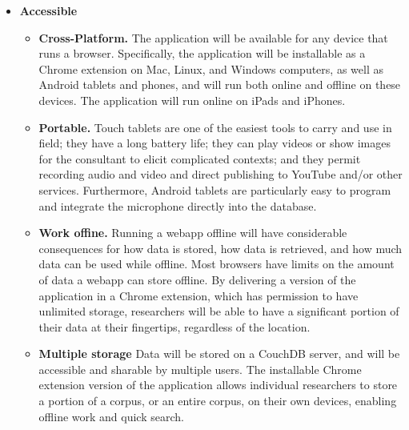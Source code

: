 \documentclass[12 pt]{article}
\begin{document}
\begin{itemize}
\item{\bf Accessible}
\begin{itemize}
\item { \bf Cross-Platform.} The application will be available for any device that runs a browser. Specifically, the application will be installable as a Chrome extension on Mac, Linux, and Windows computers, as well as Android tablets and phones, and will run both online and offline on these devices. The application will run online on iPads and iPhones. 
\item  {\bf Portable.} Touch tablets are one of the easiest tools to carry and use in field; they have a long battery life; they can play videos or show images for the consultant to elicit complicated contexts; and they permit recording audio and video and direct publishing to YouTube and/or other services. Furthermore, Android tablets are particularly easy to program and integrate the microphone directly into the database.
\item {\bf Work offine.} Running a webapp offline will have considerable consequences for how data is stored, how data is retrieved, and how much data can be used while offline. Most browsers have limits on the amount of data a webapp can store offline. By delivering a version of the application in a Chrome extension, which has permission to have unlimited storage, researchers will be able to have a significant portion of their data at their fingertips, regardless of the location. 
\item {\bf Multiple storage} Data will be stored on a CouchDB server, and will be accessible and sharable by multiple users.  The installable Chrome extension version of the application allows individual researchers to store a portion of a corpus, or an entire corpus, on their own devices, enabling offline work and quick search. 
\end{itemize}




\end{itemize}
\end{document}
